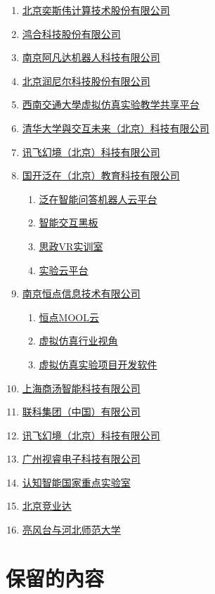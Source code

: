 \documentclass[UTF8,charset=none,a4paper,twoside]{ctexart}
\begin{document}
\begin{enumerate}
    \item \href{https://www.eswincomputing.com/industry.html}{北京奕斯伟计算技术股份有限公司}
    \item \href{https://www.honghe-tech.com/zhjy-2.html}{鸿合科技股份有限公司}
    \item \href{http://www.avatarmind.com/product-college.html}{南京阿凡达机器人科技有限公司}
    \item \href{https://www.rainier.net.cn/}{北京润尼尔科技股份有限公司}
    \item \href{https://vlab.swjtu.edu.cn/cms/c_36.html}{西南交通大學虚拟仿真实验教学共享平台}
    \item \href{https://www.ijiaodui.com/index.php?id=21}{清华大学與交互未来（北京）科技有限公司}
    \item \href{http://www.xunfeivr.com/ProductsStd_213.html}{讯飞幻境（北京）科技有限公司}
    \item \href{http://www.gkfz.net/project/sh_intelligentblackboard}{国开泛在（北京）教育科技有限公司}
          \begin{enumerate}
              \item \href{http://www.gkfz.net/project/software_robot}{泛在智能问答机器人云平台}
              \item \href{http://www.gkfz.net/project/sh_intelligentblackboard}{智能交互黑板}
              \item \href{http://www.gkfz.net/project/sh_trainingroom}{思政VR实训室}
              \item \href{http://www.gkfz.net/project/software_cloud}{实验云平台}
          \end{enumerate}
    \item \href{https://www.hdvrar.com/}{南京恒点信息技术有限公司}
          \begin{enumerate}
              \item \href{http://www.new.hdmool.com/}{恒点MOOL云}
              \item \href{https://www.hdvrar.com/col/hangyeshijiao.html}{虚拟仿真行业视角}
              \item \href{https://www.xr-edit.com/}{虚拟仿真实验项目开发软件}
          \end{enumerate}
    \item \href{https://www.sensetime.com/cn/csr_education}{上海商汤智能科技有限公司}
    \item \href{https://www.clustertech.com/zh-hans/%E4%BA%BA%E5%B7%A5%E6%99%BA%E8%83%BD%E5%92%8C%E5%88%86%E6%9E%90/AILab}{联科集团（中国）有限公司}
    \item \href{http://www.xunfeivr.com/NewsStd_544.html}{讯飞幻境（北京）科技有限公司}
    \item \href{https://www.seewo.com/}{广州视睿电子科技有限公司}
    \item \href{https://cogskl.iflytek.com/%e4%bb%a3%e8%a1%a8%e6%80%a7%e6%88%90%e6%9e%9c}{认知智能国家重点实验室}
    \item \href{http://www.jyd.com.cn/zhjs1.html}{北京竞业达}
    \item \href{https://www.hiscene.com/client-case/77}{亮风台与河北师范大学}
\end{enumerate}

\section{保留的內容}



\end{document}
